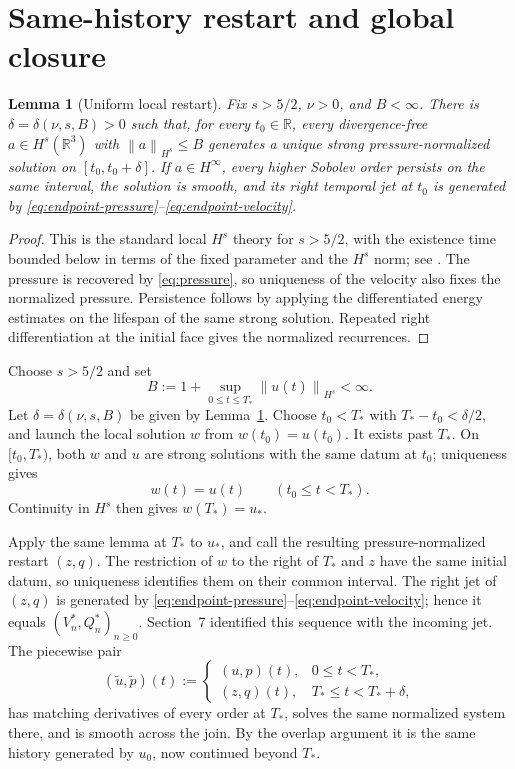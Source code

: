 \documentclass[11pt,letterpaper]{article}
\newtheorem{lemma}[theorem]{Lemma}
\theoremstyle{definition}
\theoremstyle{remark}
\newcommand{\R}{\mathbb R}
\newcommand{\norm}[1]{\left\lVert #1\right\rVert}
\begin{document}
\section{Same-history restart and global closure}

\begin{lemma}[Uniform local restart]
\label{lem:local-restart}
Fix \(s>5/2\), \(\nu>0\), and \(B<\infty\).  There is
\(\delta=\delta(\nu,s,B)>0\) such that, for every \(t_0\in\R\), every
divergence-free
\(a\in H^s(\R^3)\) with \(\norm{a}_{H^s}\le B\) generates a unique strong
pressure-normalized solution on \([t_0,t_0+\delta]\).  If
\(a\in H^\infty\), every higher Sobolev order persists on the same interval,
the solution is smooth, and its right temporal jet at \(t_0\) is generated
by \eqref{eq:endpoint-pressure}--\eqref{eq:endpoint-velocity}.
\end{lemma}

\begin{proof}
This is the standard local \(H^s\) theory for \(s>5/2\), with the existence
time bounded below in terms of the fixed parameter and the \(H^s\) norm;
see \cite{FujitaKato1964,Kato1984,Temam2001}.  The pressure is recovered by
\eqref{eq:pressure}, so uniqueness of the velocity also fixes the normalized
pressure.  Persistence follows by applying the differentiated energy
estimates on the lifespan of the same strong solution.  Repeated right
differentiation at the initial face gives the normalized recurrences.
\end{proof}

Choose \(s>5/2\) and set
\[
B:=1+\sup_{0\le t\le T_*}\norm{u(t)}_{H^s}<\infty.
\]
Let \(\delta=\delta(\nu,s,B)\) be given by
Lemma~\ref{lem:local-restart}.  Choose \(t_0<T_*\) with
\(T_*-t_0<\delta/2\), and launch the local solution \(w\) from
\(w(t_0)=u(t_0)\).  It exists past \(T_*\).  On
\([t_0,T_*)\), both \(w\) and \(u\) are strong solutions with the same datum
at \(t_0\); uniqueness gives
\[
w(t)=u(t)\qquad(t_0\le t<T_*).
\]
Continuity in \(H^s\) then gives \(w(T_*)=u_*\).

Apply the same lemma at \(T_*\) to \(u_*\), and call the resulting
pressure-normalized restart \((z,q)\).  The restriction of \(w\) to the
right of \(T_*\) and \(z\) have the
same initial datum, so uniqueness identifies them on their common interval.
The right jet of \((z,q)\) is generated by
\eqref{eq:endpoint-pressure}--\eqref{eq:endpoint-velocity}; hence it equals
\((V_n^*,Q_n^*)_{n\ge0}\).  Section~7 identified this sequence with the
incoming jet.  The piecewise pair
\[
(\widetilde u,\widetilde p)(t)
:=
\begin{cases}
(u,p)(t),&0\le t<T_*,\\
(z,q)(t),&T_*\le t<T_*+\delta,
\end{cases}
\]
has matching derivatives of every order at \(T_*\), solves the same
normalized system there, and is smooth across the join.  By the overlap
argument it is the same history generated by \(u_0\), now continued beyond
\(T_*\).
\end{document}
